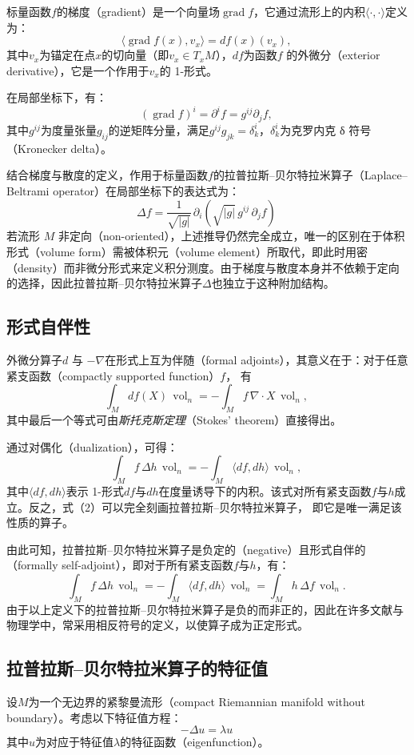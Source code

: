标量函数$f$的梯度（gradient）是一个向量场$\operatorname{grad} f$，它通过流形上的内积$\langle \cdot, \cdot \rangle$定义为：
\[
\langle \operatorname{grad} f(x), v_{x} \rangle = df(x)(v_{x}),~
\]
其中$v_{x}$为锚定在点$x$的切向量（即$v_{x} \in T_{x}M$），$df$为函数$f$ 的外微分（exterior derivative），它是一个作用于$v_{x}$的 1-形式。

在局部坐标下，有：
\[
(\operatorname{grad} f)^{i}
= \partial^{i} f
= g^{ij} \partial_{j} f,~
\]
其中$g^{ij}$为度量张量$g_{ij}$的逆矩阵分量，满足$g^{ij} g_{jk} = \delta^{i}_{k}$，$\delta^{i}_{k}$为克罗内克 δ 符号（Kronecker delta）。

结合梯度与散度的定义，作用于标量函数$f$的拉普拉斯–贝尔特拉米算子（Laplace–Beltrami operator）在局部坐标下的表达式为：
\[
\Delta f
= \frac{1}{\sqrt{|g|}} \,
  \partial_{i}
  \left(
    \sqrt{|g|} \, g^{ij} \, \partial_{j} f
  \right)~
\]
若流形 $M$ 非定向（non-oriented），上述推导仍然完全成立，唯一的区别在于体积形式（volume form）需被体积元（volume element）所取代，即此时用密（density）而非微分形式来定义积分测度。由于梯度与散度本身并不依赖于定向的选择，因此拉普拉斯–贝尔特拉米算子$\Delta$也独立于这种附加结构。
\subsection{形式自伴性}
外微分算子$d$ 与 $-\nabla$在形式上互为伴随（formal adjoints），其意义在于：对于任意紧支函数（compactly supported function）$f$，
有
\[
\int_{M} df(X) \, \operatorname{vol}_{n}
= -\int_{M} f \, \nabla \cdot X \, \operatorname{vol}_{n},~
\]
其中最后一个等式可由\emph{斯托克斯定理}（Stokes' theorem）直接得出。

通过对偶化（dualization），可得：
\[
\int_{M} f \, \Delta h \, \operatorname{vol}_{n}
= -\int_{M} \langle df, dh \rangle \, \operatorname{vol}_{n},
\tag{2}~
\]
其中$\langle df, dh \rangle$表示 1-形式$df$与$dh$在度量诱导下的内积。该式对所有紧支函数$f$与$h$成立。反之，式（2）可以完全刻画拉普拉斯–贝尔特拉米算子，
即它是唯一满足该性质的算子。

由此可知，拉普拉斯–贝尔特拉米算子是负定的（negative）且形式自伴的（formally self-adjoint），即对于所有紧支函数$f$与$h$，有：
\[
\int_{M} f \, \Delta h \, \operatorname{vol}_{n}
= -\int_{M} \langle df, dh \rangle \, \operatorname{vol}_{n}
= \int_{M} h \, \Delta f \, \operatorname{vol}_{n}.~
\]
由于以上定义下的拉普拉斯–贝尔特拉米算子是负的而非正的，因此在许多文献与物理学中，常采用相反符号的定义，以使算子成为正定形式。
\subsection{拉普拉斯–贝尔特拉米算子的特征值}
设$M$为一个无边界的紧黎曼流形（compact Riemannian manifold without boundary）。考虑以下特征值方程：
\[
-\Delta u = \lambda u~
\]
其中$u$为对应于特征值$\lambda$的特征函数（eigenfunction）。

